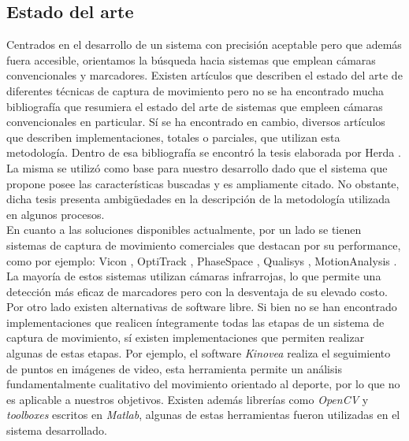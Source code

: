 \subsection{Estado del arte}
Centrados en el desarrollo de un sistema con precisión aceptable pero que además fuera accesible, orientamos la búsqueda hacia sistemas que emplean cámaras convencionales y marcadores. Existen artículos que describen el estado del arte de diferentes técnicas de captura de movimiento pero no se ha encontrado mucha bibliografía que resumiera el estado del arte de sistemas que empleen cámaras convencionales en particular. Sí se ha encontrado en cambio, diversos artículos que describen implementaciones, totales o parciales, que utilizan esta metodología. Dentro de esa bibliografía se encontró la tesis elaborada por Herda  \cite{herda}. La misma se utilizó como base para nuestro desarrollo dado que el sistema que propone posee las características buscadas y es ampliamente citado. No obstante, dicha tesis presenta ambigüedades en la descripción de la metodología utilizada en algunos procesos.\\
\hspace*{0.5cm}En cuanto a las soluciones disponibles actualmente, por un lado se tienen sistemas de captura de movimiento comerciales que destacan por su performance, como por ejemplo: Vicon \cite{vicon},
OptiTrack \cite{optitrack}, PhaseSpace \cite{phasespace}, Qualisys \cite{qualisys}, MotionAnalysis \cite{motion_analysis}. La mayoría de estos sistemas utilizan cámaras infrarrojas, lo que permite una detección más eficaz de marcadores pero con la desventaja de su elevado costo. Por otro lado existen  alternativas de software libre. Si bien no se han encontrado implementaciones que realicen íntegramente todas las etapas de un sistema de captura de movimiento, sí existen implementaciones que permiten realizar algunas de estas etapas. Por ejemplo, el software \emph{Kinovea} \cite{kinovea} realiza el seguimiento de puntos en imágenes de video, esta herramienta permite un análisis fundamentalmente cualitativo del movimiento orientado al deporte, por lo que no es aplicable a nuestros objetivos. Existen además librerías como \textit{OpenCV} y \textit{toolboxes} escritos en \emph{Matlab}, algunas de estas herramientas fueron utilizadas en el sistema desarrollado. 




